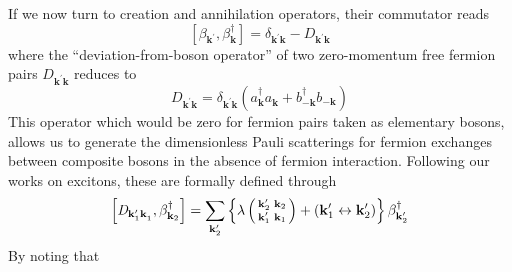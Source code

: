 \documentclass[epj]{svjour}
\newcommand{\vk}{\ensuremath{\mathbf{k}}}
\begin{document}
If we now turn to creation and annihilation operators, their commutator reads
\begin{equation}  \label{eq:betacom}
\left[\beta_{\mathbf{k} ^{\prime}},\beta^{\dagger}_{\mathbf{k} }\right] 
=\delta_{\mathbf{k} ^{\prime}\mathbf{k} }-\mathit{D} _{\mathbf{k} ^{\prime}%
\mathbf{k} }
\end{equation}
where the ``deviation-from-boson operator'' of two zero-momentum free fermion pairs $\mathit{D} _{\mathbf{k} ^{\prime}\mathbf{k%
} }$ reduces to 
\begin{equation}  \label{eq:D}
\mathit{D} _{\mathbf{k} ^{\prime}\mathbf{k} }=\delta_{\mathbf{k} ^{\prime}%
\mathbf{k} }\left(a^{\dagger}_{\mathbf{k}}a^{}_{\mathbf{k}
}+b^{\dagger}_{-\mathbf{k} }b^{}_{-\mathbf{k}
}\right) 
\end{equation}
This operator which would be  zero for fermion pairs  taken as
elementary bosons, allows us to generate the dimensionless Pauli scatterings for fermion
exchanges between composite bosons in the absence of fermion interaction. Following our works on excitons\cite%
{CobosonPhysicsReports}, these are formally defined through 
\begin{equation}\label{eq:dbeta}
\left[\mathit{D} _{\mathbf{k} ^{\prime}_1\mathbf{k} ^{}_1},\beta^{\dagger}_{%
\mathbf{k} _2}\right]  =\sum_{\mathbf{k} ^{\prime}_2}\left\{\lambda\left(%
\begin{smallmatrix}\vk'_2&\vk_2\\\vk'_1&\vk_1\end{smallmatrix}\right) 
+\left(\mathbf{k} ^{\prime}_1\leftrightarrow\mathbf{k} ^{\prime}_2\right)
\right\} \beta^{\dagger}_{\mathbf{k} ^{\prime}_2}
\end{equation}
By noting that
\end{document}
